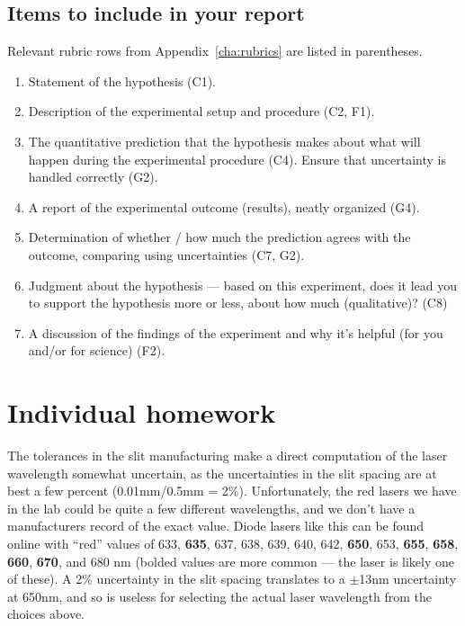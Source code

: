 \subsection{Items to include in your report}

Relevant rubric rows from Appendix~\ref{cha:rubrics} are listed in parentheses.

\begin{enumerate}
	\item Statement of the hypothesis (C1).

	\item Description of the experimental setup and procedure (C2, F1).
	
	\item The quantitative prediction that the hypothesis makes about what will happen during the experimental procedure (C4). Ensure that uncertainty is handled correctly (G2).
	
	\item A report of the experimental outcome (results), neatly organized (G4).
	
	\item Determination of whether / how much the prediction agrees with the outcome, comparing using uncertainties (C7, G2).
	
	\item Judgment about the hypothesis --- based on this experiment, does it lead you to support the hypothesis more or less, about how much (qualitative)? (C8)
	
	\item A discussion of the findings of the experiment and why it's helpful (for you and/or for science) (F2).
\end{enumerate}

\section{Individual homework}

The tolerances in the slit manufacturing make a direct computation of the laser wavelength somewhat uncertain, as the uncertainties in the slit spacing are at best a few percent (0.01mm/0.5mm = 2\%). Unfortunately, the red lasers we have in the lab could be quite a few different wavelengths, and we don't have a manufacturers record of the exact value. Diode lasers like this can be found online with “red” values of 633, \textbf{635}, 637, 638, 639, 640, 642, \textbf{650}, 653, \textbf{655}, \textbf{658}, \textbf{660}, \textbf{670}, and 680 nm (bolded values are more common --- the laser is likely one of these).
A 2\% uncertainty in the slit spacing translates to a $\pm$13nm uncertainty at 650nm, and so is useless for selecting the actual laser wavelength from the choices above.

